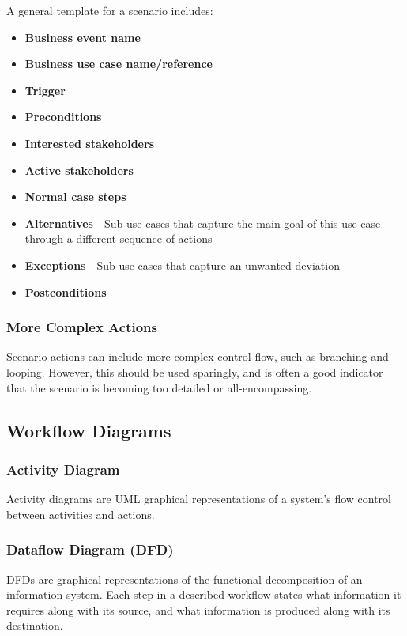 \documentclass[12pt,titlepage]{article}
\begin{document}
      A general template for a scenario includes:
      \begin{itemize}
        \item \textbf{Business event name}
        \item \textbf{Business use case name/reference}
        \item \textbf{Trigger}
        \item \textbf{Preconditions}
        \item \textbf{Interested stakeholders}
        \item \textbf{Active stakeholders}
        \item \textbf{Normal case steps}
        \item \textbf{Alternatives} - Sub use cases that capture the main goal of this use case through a different sequence of actions
        \item \textbf{Exceptions} - Sub use cases that capture an unwanted deviation
        \item \textbf{Postconditions}
      \end{itemize}

      \subsubsection{More Complex Actions}
        Scenario actions can include more complex control flow, such as branching and looping. However, this should be used sparingly, and is
        often a good indicator that the scenario is becoming too detailed or all-encompassing.

    \subsection{Workflow Diagrams}
      \subsubsection{Activity Diagram}
        Activity diagrams are UML graphical representations of a system's flow control between activities and actions.

      \subsubsection{Dataflow Diagram (DFD)}
        DFDs are graphical representations of the functional decomposition of an information system. Each step in a described workflow
        states what information it requires along with its source, and what information is produced along with its destination.
\end{document}
